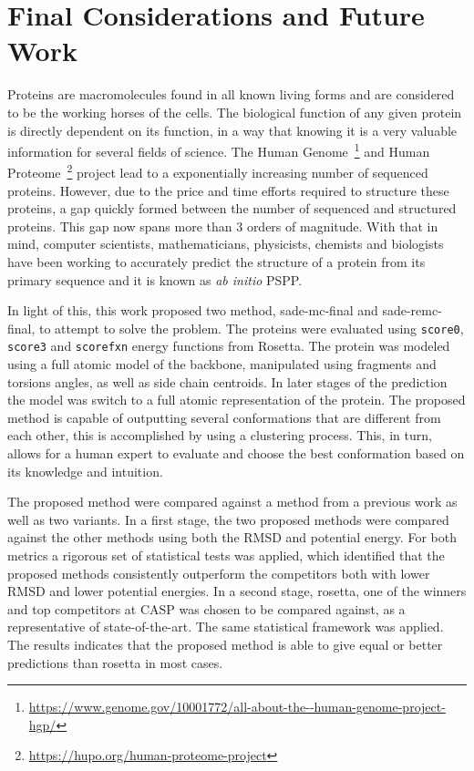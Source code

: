 \chapter{Final Considerations and Future Work}
\label{chap:final_considerations}

Proteins are macromolecules found in all known living forms and are
considered to be the working horses of the cells. The biological
function of any given protein is directly dependent on its
function, in a way that knowing it is a very valuable information
for several fields of science. The Human
Genome~\footnote{\url{https://www.genome.gov/10001772/all-about-the--human-genome-project-hgp/}}
and Human Proteome~\footnote{\url{https://hupo.org/human-proteome-project}} project
lead to a exponentially increasing number of sequenced proteins.
However, due to the price and time efforts required to structure
these proteins, a gap quickly formed between the number of sequenced
and structured proteins. This gap now spans more than 3 orders
of magnitude. With that in mind, computer scientists, mathematicians,
physicists, chemists and biologists have been working to accurately
predict the structure of a protein from its primary
sequence and it is known as \textit{ab initio} PSPP.

In light of this, this work proposed two method, sade-mc-final and
sade-remc-final, to attempt to solve the problem. The proteins were evaluated
using \texttt{score0}, \texttt{score3} and \texttt{scorefxn} energy functions
from Rosetta. The protein was modeled using a full atomic model of the backbone,
manipulated using fragments and torsions angles, as well as side chain centroids.
In later stages of the prediction the model was switch to a full atomic
representation of the protein. The proposed method is capable of outputting
several conformations that are different from each other, this is accomplished
by using a clustering process. This, in turn, allows for a human expert to
evaluate and choose the best conformation based on its knowledge and intuition.

The proposed method were compared against a method from a previous work as
well as two variants. In a first stage, the two proposed methods were compared
against the other methods using both the RMSD and potential energy. For both
metrics a rigorous set of statistical tests was applied, which identified that
the proposed methods consistently outperform the competitors both with lower
RMSD and lower potential energies. In a second stage, rosetta, one of the
winners and top competitors at CASP was chosen to be compared against, as a
representative of state-of-the-art. The same statistical framework was applied.
The results indicates that the proposed method is able to give equal or better
predictions than rosetta in most cases.

